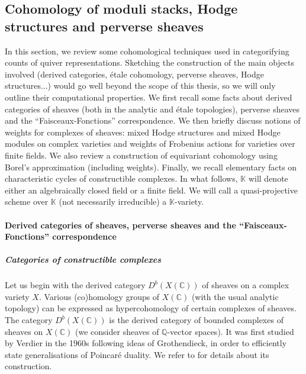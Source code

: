 \documentclass[11pt,english]{article}
\numberwithin{equation}{section}
\numberwithin{figure}{section}
\theoremstyle{definition}
\theoremstyle{plain}
\theoremstyle{remark}
\newcommand\QQ{\mathbb{Q}}
\newcommand\KK{\mathbb{K}}
\newcommand\CC{\mathbb{C}}
\begin{document}
\subsection{Cohomology of moduli stacks, Hodge structures and perverse sheaves
\label{Subsect/CohAlgVar}}

In this section, we review some cohomological techniques used in categorifying
counts of quiver representations. Sketching the construction of the
main objects involved (derived categories, étale cohomology, perverse
sheaves, Hodge structures...) would go well beyond the scope of this
thesis, so we will only outline their computational properties. We
first recall some facts about derived categories of sheaves (both
in the analytic and étale topologies), perverse sheaves and the ``Faisceaux-Fonctions''
correspondence. We then briefly discuss notions of weights for complexes
of sheaves: mixed Hodge structures and mixed Hodge modules on complex
varieties and weights of Frobenius actions for varieties over finite
fields. We also review a construction of equivariant cohomology using
Borel's approximation (including weights). Finally, we recall elementary
facts on characteristic cycles of constructible complexes. In what
follows, $\KK$ will denote either an algebraically closed field or
a finite field. We will call a quasi-projective scheme over $\KK$
(not necessarily irreducible) a $\KK$-variety.

\paragraph*{Derived categories of sheaves, perverse sheaves and the ``Faisceaux-Fonctions''
correspondence}

\subparagraph*{Categories of constructible complexes}

Let us begin with the derived category $D^{b}(X(\CC))$ of sheaves
on a complex variety $X$. Various (co)homology groups of $X(\CC)$
(with the usual analytic topology) can be expressed as hypercohomology
of certain complexes of sheaves. The category $D^{b}(X(\CC))$ is
the derived category of bounded complexes of sheaves on $X(\CC)$
(we consider sheaves of $\QQ$-vector spaces). It was first studied
by Verdier in the 1960s following ideas of Grothendieck, in order
to efficiently state generalisations of Poincaré duality. We refer
to \cite[Ch. 2,3.]{Dim04} for details about its construction.
\end{document}
